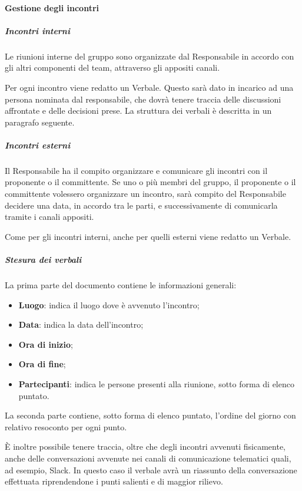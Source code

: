    	\paragraph{Gestione degli incontri}

   		\subparagraph*{Incontri interni}
   		Le riunioni interne del gruppo sono organizzate dal Responsabile in accordo con gli altri componenti del team, attraverso gli appositi canali.

   		\noindent Per ogni incontro viene redatto un Verbale. Questo sarà dato in incarico ad una persona nominata dal responsabile, che dovrà tenere traccia delle discussioni affrontate e delle decisioni prese. La struttura dei verbali è descritta in un paragrafo seguente.

   		\subparagraph*{Incontri esterni}
   		Il Responsabile ha il compito organizzare e comunicare gli incontri con il proponente o il committente. Se uno o più membri del gruppo, il proponente o il committente volessero organizzare un incontro, sarà compito del Responsabile decidere una data, in accordo tra le parti, e successivamente di comunicarla tramite i canali appositi.

   		\noindent Come per gli incontri interni, anche per quelli esterni viene redatto un Verbale.
   		\subparagraph*{Stesura dei verbali}
   		La prima parte del documento contiene le informazioni generali:
   		\begin{itemize}
   			\item \textbf{Luogo}: indica il luogo dove è avvenuto l'incontro;
   			\item \textbf{Data}: indica la data dell'incontro;
   			\item \textbf{Ora di inizio};
   			\item \textbf{Ora di fine};
   			\item \textbf{Partecipanti}: indica le persone presenti alla riunione, sotto forma di elenco puntato.
   		\end{itemize}
   		La seconda parte contiene, sotto forma di elenco puntato, l'ordine del giorno con relativo resoconto per ogni punto.

   		\noindent È inoltre possibile tenere traccia, oltre che degli incontri avvenuti fisicamente, anche delle conversazioni avvenute nei canali di comunicazione telematici quali, ad esempio, Slack. In questo caso il verbale avrà un riassunto della conversazione effettuata riprendendone i punti salienti e di maggior rilievo.


